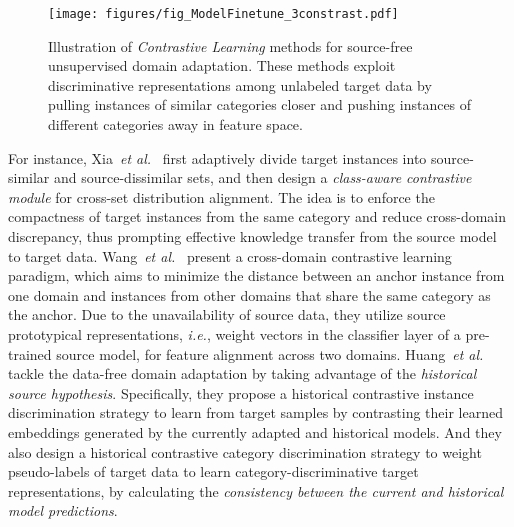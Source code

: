 \documentclass[10pt,journal,compsoc]{IEEEtran}
\def\etal{{\em et al.}}
\def\ie{{\em i.e.}}
\begin{document}
\begin{figure}[!t]
\setlength{\abovecaptionskip}{0pt}
\setlength{\belowcaptionskip}{-2pt}
\setlength{\abovedisplayskip}{-2pt}
\setlength{\belowdisplayskip}{-2pt}
	\centering
	\texttt{[image: figures/fig\_ModelFinetune\_3constrast.pdf]}
	\caption{Illustration of \emph{Contrastive Learning} methods for source-free unsupervised domain adaptation.
	These methods exploit discriminative representations among unlabeled target data by pulling instances of similar categories closer and
pushing instances of different categories away 
in feature space.}
	\label{fig_ModelFinetune_3constrast}
\end{figure}

For instance, Xia~\etal~\cite{xia2021adaptive} first adaptively divide target instances into source-similar and source-dissimilar sets, and then design a \emph{class-aware contrastive module} for cross-set distribution alignment.
The idea is to enforce the compactness of target instances from the same category and reduce cross-domain discrepancy, thus prompting effective knowledge transfer from the source model to target data. 
Wang~\etal~\cite{wang2022cross} present a cross-domain contrastive learning paradigm, which aims to minimize the distance between an anchor instance from one domain and instances %
from other domains that share the same category as the anchor.
Due to the unavailability of source data, they utilize source prototypical representations, \ie,  weight vectors in
the classifier layer of a pre-trained %
source model, for feature alignment across two domains.
Huang~\etal~\cite{huang2021model} tackle the data-free domain adaptation by taking advantage of the \emph{historical source hypothesis}.
Specifically, they propose a historical contrastive instance discrimination strategy to learn from target samples by contrasting their learned embeddings generated by the currently adapted and historical models. 
And they also design a historical contrastive category discrimination strategy to weight pseudo-labels of target data to learn category-discriminative target representations, by calculating the \emph{consistency between the current and historical model predictions}.
\end{document}
